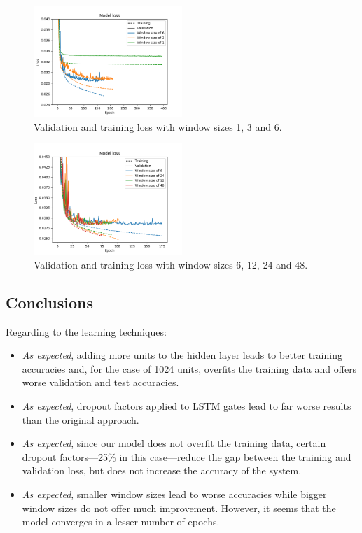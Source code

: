 \documentclass[]{article}
\begin{document}
	\begin{figure}[H]
		\centering
		\includegraphics[width=0.5\textwidth]{variables_4_1}
		\caption{Validation and training loss with window sizes 1, 3 and 6.}
		\label{f:variables_4_1}
	\end{figure}
	
	\begin{figure}[H]
		\centering
		\includegraphics[width=0.5\textwidth]{variables_4_2}
		\caption{Validation and training loss with window sizes 6, 12, 24 and 48.}
		\label{f:variables_4_2}
	\end{figure}
	
	\subsection{Conclusions}
	
	Regarding to the learning techniques:
	
	\begin{itemize}
		\item \emph{As expected}, adding more units to the hidden layer leads to better training accuracies and, for the case of 1024 units, overfits the training data and offers worse validation and test accuracies.
		
		\item \emph{As expected}, dropout factors applied to LSTM gates lead to far worse results than the original approach.
		
		\item \emph{As expected}, since our model does not overfit the training data, certain dropout factors---25\% in this case---reduce the gap between the training and validation loss, but does not increase the accuracy of the system.
		
		\item \emph{As expected}, smaller window sizes lead to worse accuracies while bigger window sizes do not offer much improvement. However, it seems that the model converges in a lesser number of epochs.
	\end{itemize}
	
\end{document}
